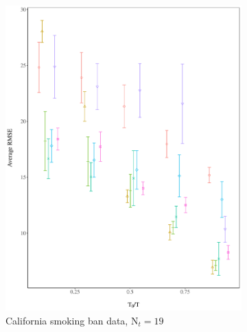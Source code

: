 \documentclass[hidelinks,12pt]{article}
\begin{document}
\begin{figure}[htbp]
\begin{subfigure}[t]{0.48\textwidth}
		\includegraphics[width=\textwidth]{plots/california-stag.png}
		\caption{California smoking ban data, $\text{N}_t = 19$}
	\end{subfigure}
	~ 
	\begin{subfigure}[t]{0.48\textwidth}
		\centering

\end{subfigure}
\end{figure}
\end{document}
